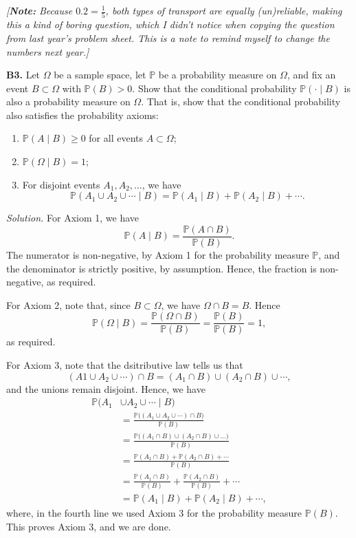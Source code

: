 \documentclass[
  a4paper,
]{book}
\providecommand{\tightlist}{%
  \setlength{\itemsep}{0pt}\setlength{\parskip}{0pt}}
\theoremstyle{definition}
\theoremstyle{definition}
\theoremstyle{definition}
\theoremstyle{definition}
\theoremstyle{remark}
\begin{document}
\emph{{[}\textbf{Note:} Because \(0.2 = \frac15\), both types of transport are equally (un)reliable, making this a kind of boring question, which I didn't notice when copying the question from last year's problem sheet. This is a note to remind myself to change the numbers next year.{]}}

\textbf{B3.} Let \(\Omega\) be a sample space, let \(\mathbb P\) be a probability measure on \(\Omega\), and fix an event \(B \subset \Omega\) with \(\mathbb P(B) > 0\). Show that the conditional probability \(\mathbb P( {\cdot} \mid B)\) is also a probability measure on \(\Omega\). That is, show that the conditional probability also satisfies the probability axioms:

\begin{enumerate}
\def\labelenumi{\arabic{enumi}.}
\tightlist
\item
  \(\mathbb P(A \mid B) \geq 0\) for all events \(A \subset \Omega\);
\item
  \(\mathbb P(\Omega \mid B) = 1\);
\item
  For disjoint events \(A_1, A_2, \dots\), we have
  \[ \mathbb P(A_1 \cup A_2 \cup \cdots \mid B) = \mathbb P(A_1 \mid B) + \mathbb P(A_2 \mid B) + \cdots . \]
\end{enumerate}

\begin{myanswers}
\emph{Solution.}
For Axiom 1, we have
\[ \mathbb P(A \mid B) = \frac{\mathbb P(A \cap B)}{\mathbb P(B)} . \]
The numerator is non-negative, by Axiom 1 for the probability measure \(\mathbb P\), and the denominator is strictly positive, by assumption. Hence, the fraction is non-negative, as required.

For Axiom 2, note that, since \(B \subset \Omega\), we have \(\Omega \cap B = B\). Hence
\[ \mathbb P(\Omega \mid B) = \frac{\mathbb P(\Omega \cap B)}{\mathbb P(B)} = \frac{\mathbb P(B)}{\mathbb P(B)} = 1 , \]
as required.

For Axiom 3, note that the dsitributive law tells us that
\[ (A1 \cup A_2 \cup \cdots) \cap B = (A_1 \cap B) \cup (A_2 \cap B) \cup \cdots , \]
and the unions remain disjoint. Hence, we have
\begin{align*}
\mathbb P(A_1 &\cup A_2 \cup \cdots \mid B) \\
&= \frac{\mathbb P\big((A_1 \cup A_2 \cup \cdots) \cap B\big)}{\mathbb P(B)} \\
&= \frac{\mathbb P\big((A_1 \cap B) \cup (A_2 \cap B) \cup \dots\big)}{\mathbb P(B)} \\
&= \frac{\mathbb P(A_1 \cap B) + \mathbb P(A_2 \cap B) + \cdots}{\mathbb P(B)} \\
&= \frac{\mathbb P(A_1 \cap B)}{\mathbb P(B)} + \frac{\mathbb P(A_2 \cap B)}{\mathbb P(B)} + \cdots \\
&= \mathbb P(A_1 \mid B) + \mathbb P(A_2 \mid B) + \cdots, 
\end{align*}
where, in the fourth line we used Axiom 3 for the probability measure \(\mathbb P(B)\). This proves Axiom 3, and we are done.

\end{myanswers}
\end{document}
